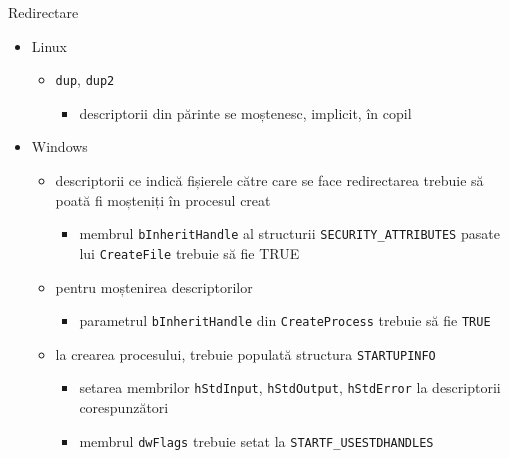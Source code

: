 \documentclass{so.cs.pub.ro}
\begin{document}
\begin{frame}{Redirectare}
	\begin{itemize}
		\item Linux	
		\begin{itemize}
			\item \texttt{dup}, \texttt{dup2}
			\begin{itemize}
				\item descriptorii din părinte se moștenesc, implicit, în copil
			\end{itemize}
		\end{itemize}
		\vspace*{0.1cm}
		\item Windows
		\begin{itemize}
			\item descriptorii ce indică fișierele către care se face redirectarea trebuie să poată fi moșteniți în procesul creat
			\begin{itemize}
				\item membrul \texttt{bInheritHandle} al structurii \texttt{SECURITY_ATTRIBUTES} pasate lui \texttt{CreateFile} trebuie să fie TRUE
			\end{itemize}			
		\vspace*{0.1cm}
			\item pentru moștenirea descriptorilor
			\begin{itemize}
				\item parametrul \texttt{bInheritHandle} din \texttt{CreateProcess} trebuie să fie \texttt{TRUE}
			\end{itemize}
		\vspace*{0.1cm}
			\item la crearea procesului, trebuie populată structura \texttt{STARTUPINFO}
			\begin{itemize}
				\item setarea membrilor \texttt{hStdInput}, \texttt{hStdOutput}, \texttt{hStdError} la descriptorii corespunzători
				\item membrul \texttt{dwFlags} trebuie setat la \texttt{STARTF_USESTDHANDLES}
			\end{itemize}
		\end{itemize}
	\end{itemize}
\end{frame}
\end{document}

